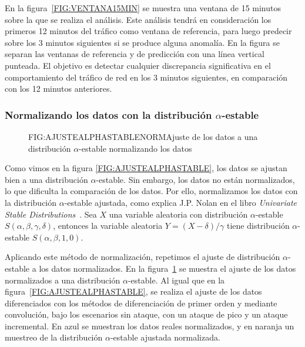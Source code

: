 En la figura~\ref{FIG:VENTANA15MIN} se muestra una ventana de 15 minutos sobre la que se realiza el análisis. Este análisis tendrá en consideración los primeros 12 minutos del tráfico como ventana de referencia, para luego predecir sobre los 3 minutos siguientes si se produce alguna anomalía. En la figura se separan las ventanas de referencia y de predicción con una línea vertical punteada. El objetivo es detectar cualquier discrepancia significativa en el comportamiento del tráfico de red en los 3 minutos siguientes, en comparación con los 12 minutos anteriores.

\subsubsection{Normalizando los datos con la distribución $\alpha$-estable}\label{SUBSEC:NORMALIZACIONALPHASTABLE}

\begin{figure}[Ajuste de los datos a una distribución $\alpha$-estable normalizando los datos]{FIG:AJUSTEALPHASTABLENORM}{Ajuste de los datos a una distribución $\alpha$-estable normalizando los datos}
    \label{FIG:AJUSTEALPHASTABLENORM}
\end{figure}

Como vimos en la figura \ref{FIG:AJUSTEALPHASTABLE}, los datos se ajustan bien a una distribución $\alpha$-estable. Sin embargo, los datos no están normalizados, lo que dificulta la comparación de los datos. Por ello, normalizamos los datos con la distribución $\alpha$-estable ajustada, como explica J.P. Nolan en el libro \textit{Univariate Stable Distributions}~\cite{nolan2020univariate}. Sea $X$ una variable aleatoria con distribución $\alpha$-estable $S(\alpha, \beta, \gamma, \delta)$, entonces la variable aleatoria $Y = (X - \delta) / \gamma$ tiene distribución $\alpha$-estable $S(\alpha, \beta, 1, 0)$.

Aplicando este método de normalización, repetimos el ajuste de distribución $\alpha$-estable a los datos normalizados. En la figura~\ref{FIG:AJUSTEALPHASTABLENORM} se muestra el ajuste de los datos normalizados a una distribución $\alpha$-estable. Al igual que en la figura~\ref{FIG:AJUSTEALPHASTABLE}, se realiza el ajuste de los datos diferenciados con los métodos de diferenciación de primer orden y mediante convolución, bajo los escenarios sin ataque, con un ataque de pico y un ataque incremental. En azul se muestran los datos reales normalizados, y en naranja un muestreo de la distribución $\alpha$-estable ajustada normalizada.


